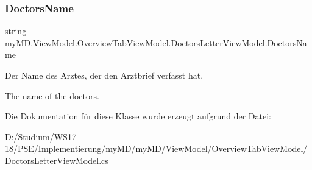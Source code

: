 \subsubsection{\texorpdfstring{Doctors\+Name}{DoctorsName}}
{\footnotesize\ttfamily string my\+M\+D.\+View\+Model.\+Overview\+Tab\+View\+Model.\+Doctors\+Letter\+View\+Model.\+Doctors\+Name\hspace{0.3cm}{\ttfamily [get]}}



Der Name des Arztes, der den Arztbrief verfasst hat. 

The name of the doctors.

Die Dokumentation für diese Klasse wurde erzeugt aufgrund der Datei\+:\begin{DoxyCompactItemize}
\item 
D\+:/\+Studium/\+W\+S17-\/18/\+P\+S\+E/\+Implementierung/my\+M\+D/my\+M\+D/\+View\+Model/\+Overview\+Tab\+View\+Model/\mbox{\hyperlink{_doctors_letter_view_model_8cs}{Doctors\+Letter\+View\+Model.\+cs}}\end{DoxyCompactItemize}
